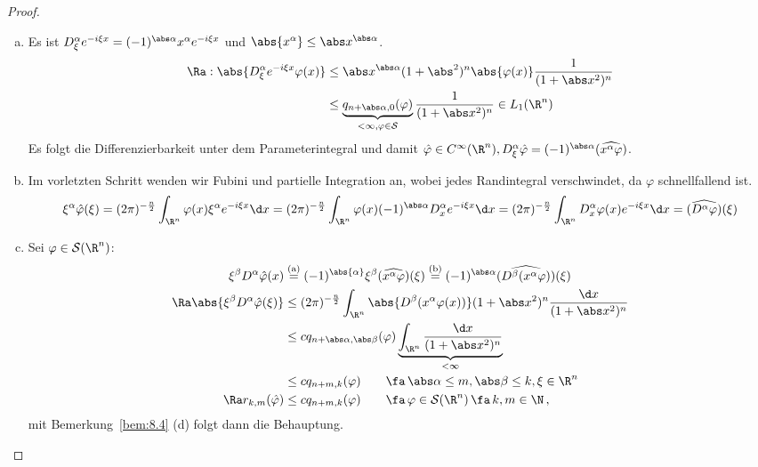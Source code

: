 \begin{proof}
\begin{enumerate}[(a)]
\item Es ist $D_\xi^\alpha e^{-i\xi x } = (-1)^{\abs\alpha} x^\alpha e^{-i \xi x}$ und $\abs{x^\alpha} \leq \abs x^{\abs\alpha}$.
\begin{align*}
	\Ra: \abs{D_\xi^\alpha e^{-i\xi x} \varphi (x)} &\leq \abs x^{\abs\alpha} (1+\abs^2)^n \abs{\varphi(x)} \frac 1{(1+\abs x^2)^n} \\
	&\leq \underbrace{q_{n+\abs\alpha, 0}(\varphi)}_{<\infty, \varphi \in \mathcal S} \frac 1{(1+\abs x^2)^n} \in L_1(\R^n)
\end{align*}
Es folgt die Differenzierbarkeit unter dem Parameterintegral und damit $\hat \varphi \in C^\infty (\R^n), D_\xi^\alpha \hat \varphi = (-1)^{\abs\alpha} (\widehat{x^\alpha \varphi})$.
\item Im vorletzten Schritt wenden wir Fubini und partielle Integration an, wobei jedes Randintegral verschwindet, da $\varphi$ schnellfallend ist.
\begin{dmath*}
	\xi^\alpha \hat\varphi(\xi) = (2\pi)^{-\frac n2} \int_{\R^n} \varphi(x) \xi^\alpha e^{-i \xi x} \d x
	= (2\pi)^{-\frac n2} \int_{\R^n} \varphi(x) (-1)^{\abs\alpha} D_x^\alpha e^{-i\xi x} \d x 
	= (2\pi)^{-\frac n2} \int_{\R^n} D_x^\alpha \varphi(x) e^{-i\xi x} \d x = (\widehat{D^\alpha \varphi})(\xi)
\end{dmath*}
\item Sei $\varphi \in \mathcal S(\R^n)$:
\begin{align*}
	\xi^\beta D^\alpha \hat \varphi(x) &\stackrel{\scriptsize\text{(a)}}= (-1)^{\abs{\alpha}} \xi^\beta (\widehat{x^\alpha \varphi})(\xi)
	\stackrel{\scriptsize\text{(b)}}= (-1)^{\abs\alpha} (\widehat{D^\beta (x^\alpha \varphi)})(\xi) \\
\Ra \abs{\xi^\beta D^\alpha \hat\varphi (\xi)} & \leq (2\pi)^{-\frac n 2} \int_{\R^n} \abs{D^\beta (x^\alpha \varphi(x))}(1+\abs x^2)^n \frac{\d x}{(1+\abs x^2)^n} \\
& \leq c q_{n+\abs\alpha,\abs\beta}(\varphi) \underbrace{\int_{\R^n} \frac{\d x}{(1+\abs x^2)^n}}_{< \infty} \\
& \leq cq_{n+m,k}(\varphi) \qquad \fa \, \abs\alpha \leq m, \abs\beta \leq k , \xi \in \R^n \\
\Ra r_{k,m} (\hat\varphi) & \leq c q_{n+m,k}(\varphi) \qquad \fa \, \varphi \in \mathcal S(\R^n) \, \fa \, k,m\in\N \, ,
\end{align*}
mit Bemerkung~\ref{bem:8.4} (d) folgt dann die Behauptung.\qedhere
\end{enumerate}
\end{proof}

